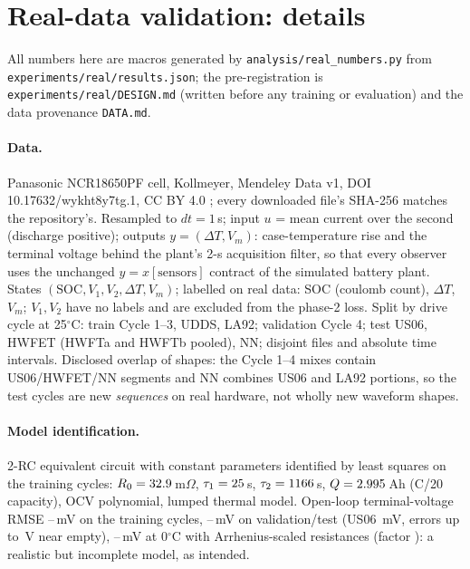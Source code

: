 \section{Real-data validation: details}\label{app:realdata}

All numbers here are macros generated by \texttt{analysis/real\_numbers.py} from \texttt{experiments/real/results.json}; the pre-registration is \texttt{experiments/real/DESIGN.md} (written before any training or evaluation) and the data provenance \texttt{DATA.md}.

\paragraph{Data.} Panasonic NCR18650PF cell, Kollmeyer, Mendeley Data v1, DOI 10.17632/wykht8y7tg.1, CC BY 4.0 \citep{kollmeyer2018panasonic}; every downloaded file's SHA-256 matches the repository's. Resampled to $dt=1$\,s; input $u$ = mean current over the second (discharge positive); outputs $y=(\Delta T, V_m)$: case-temperature rise and the terminal voltage behind the plant's 2-s acquisition filter, so that every observer uses the unchanged $y=x[\text{sensors}]$ contract of the simulated battery plant. States $(\mathrm{SOC},V_1,V_2,\Delta T,V_m)$; labelled on real data: SOC (coulomb count), $\Delta T$, $V_m$; $V_1,V_2$ have no labels and are excluded from the phase-2 loss. Split by drive cycle at 25$^\circ$C: train Cycle 1--3, UDDS, LA92; validation Cycle 4; test US06, HWFET (HWFTa and HWFTb pooled), NN; disjoint files and absolute time intervals. Disclosed overlap of shapes: the Cycle 1--4 mixes contain US06/HWFET/NN segments and NN combines US06 and LA92 portions, so the test cycles are new \emph{sequences} on real hardware, not wholly new waveform shapes.

\paragraph{Model identification.} 2-RC equivalent circuit with constant parameters identified by least squares on the training cycles: $R_0=32.9$\,m$\Omega$, $\tau_1=25$\,s, $\tau_2=1166$\,s, $Q=2.995$\,Ah (C/20 capacity), OCV polynomial, lumped thermal model. Open-loop terminal-voltage RMSE \RealVmFitTrainMin--\RealVmFitTrainMax\,mV on the training cycles, \RealVmFitValTestMin--\RealVmFitValTestMax\,mV on validation/test (US06 \RealVmFitUsZeroSix\,mV, errors up to \RealEcmVmax\,V near empty), \RealVmFitZeroMin--\RealVmFitZeroMax\,mV at 0$^\circ$C with Arrhenius-scaled resistances (factor \RealArrheniusFactor): a realistic but incomplete model, as intended.

